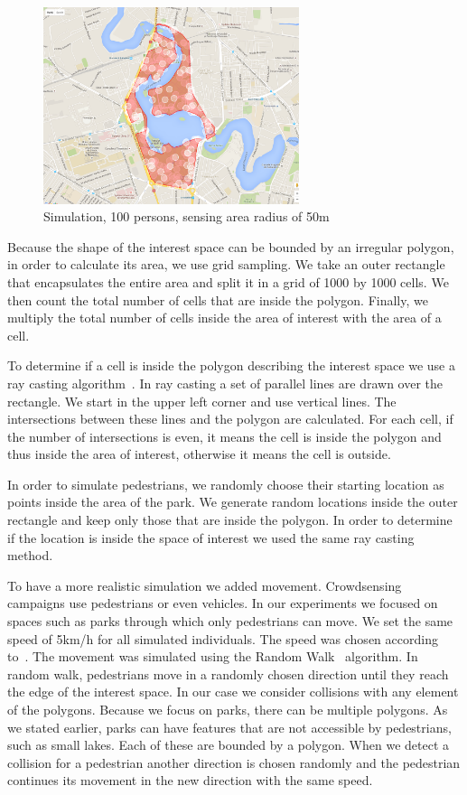 \begin{figure}
	\centering\includegraphics[width=7.5cm]{src/img/Herastrau-100pers-50m.png}
	\caption{Simulation, 100 persons, sensing area radius of 50m}
	\label{fig:1}
\end{figure}

Because the shape of the interest space can be bounded by an irregular polygon, in order to calculate its area, we use grid sampling. We take an outer rectangle that encapsulates the entire area and split it in a grid of 1000 by 1000 cells. We then count the total number of cells that are inside the polygon. Finally, we multiply the total number of cells inside the area of interest with the area of a cell.

To determine if a cell is inside the polygon describing the interest space we use a ray casting algorithm~\cite{roth1982ray}. In ray casting a set of parallel lines are drawn over the rectangle. We start in the upper left corner and use vertical lines. The intersections between these lines and the polygon are calculated. For each cell, if the number of intersections is even, it means the cell is inside the polygon and thus inside the area of interest, otherwise it means the cell is outside.

In order to simulate pedestrians, we randomly choose their starting location as points inside the area of the park. We generate random locations inside the outer rectangle and keep only those that are inside the polygon. In order to determine if the location is inside the space of interest we used the same ray casting method.

To have a more realistic simulation we added movement. Crowdsensing campaigns use pedestrians or even vehicles. In our experiments we focused on spaces such as parks through which only pedestrians can move. We set the same speed of 5km/h for all simulated individuals. The speed was chosen according to~\cite{carey2005establishing}. The movement was simulated using the Random Walk~\cite{pearson1905problem} algorithm. In random walk, pedestrians move in a randomly chosen direction until they reach the edge of the interest space. In our case we consider collisions with any element of the polygons. Because we focus on parks, there can be multiple polygons. As we stated earlier, parks can have features that are not accessible by pedestrians, such as small lakes. Each of these are bounded by a polygon. When we detect a collision for a pedestrian another direction is chosen randomly and the pedestrian continues its movement in the new direction with the same speed.

